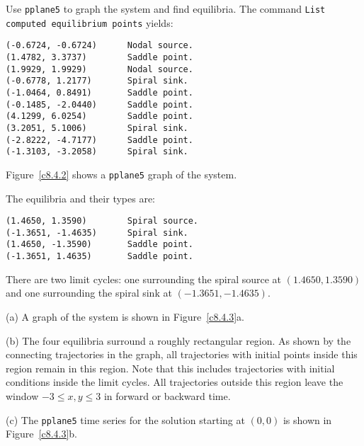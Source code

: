 \begin{figure}[htb]
                       \centerline{%
                       }
\end{figure}

Use {\tt pplane5} to graph the system and find equilibria.  The
command {\tt List computed equilibrium points} yields:
\begin{verbatim}
(-0.6724, -0.6724)      Nodal source.
(1.4782, 3.3737)        Saddle point.
(1.9929, 1.9929)        Nodal source.
(-0.6778, 1.2177)       Spiral sink.
(-1.0464, 0.8491)       Saddle point.
(-0.1485, -2.0440)      Saddle point.
(4.1299, 6.0254)        Saddle point.
(3.2051, 5.1006)        Spiral sink.
(-2.8222, -4.7177)      Saddle point.
(-1.3103, -3.2058)      Spiral sink.
\end{verbatim}
Figure~\ref{c8.4.2} shows a {\tt pplane5} graph of the system.

\begin{figure}[htb]
                       \centerline{%
                       }
\end{figure}

The equilibria and their types are:
\begin{verbatim}
(1.4650, 1.3590)        Spiral source.           
(-1.3651, -1.4635)      Spiral sink.             
(1.4650, -1.3590)       Saddle point.            
(-1.3651, 1.4635)       Saddle point. 
\end{verbatim}
There are two limit cycles: one surrounding the spiral source at
$(1.4650, 1.3590)$ and one surrounding the spiral sink at $(-1.3651, -1.4635)$.

(a) A graph of the system is shown in Figure~\ref{c8.4.3}a.

(b) The four equilibria surround a roughly rectangular region.  As shown
by the connecting trajectories in the graph, all trajectories with
initial points inside this region remain in this region.  Note that this
includes trajectories with initial conditions inside the limit cycles.
All trajectories outside this region leave the window
$-3 \leq x,y \leq 3$ in forward or backward time.

(c) The {\tt pplane5} time series for the solution starting at $(0,0)$ is
shown in Figure~\ref{c8.4.3}b.

\begin{figure}[htb]
                       \centerline{%
                       }
\end{figure}

